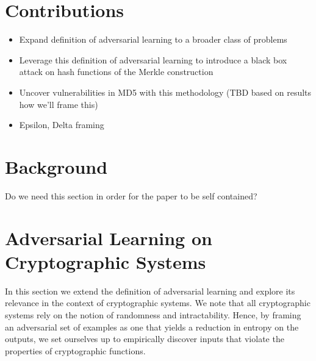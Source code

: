 \section{Contributions}
\begin{itemize}
\item Expand definition of adversarial learning to a broader class of problems 
\item Leverage this definition of adversarial learning to introduce a black box attack on hash functions of the Merkle construction 
\item Uncover vulnerabilities in MD5 with this methodology (TBD based on results how we'll frame this) 
\item Epsilon, Delta framing 
\end{itemize}

\section{Background}

Do we need this section in order for the paper to be self contained? 

\section{Adversarial Learning on Cryptographic Systems}

In this section we extend the definition of adversarial learning and explore its relevance in the context of cryptographic systems. We note that all cryptographic systems rely on the notion of randomness and intractability. Hence, by framing an adversarial set of examples as one that yields a reduction in entropy on the outputs, we set ourselves up to empirically discover inputs that violate the properties of cryptographic functions. 

